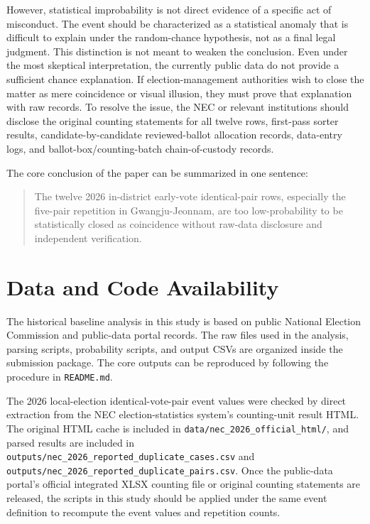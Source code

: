 \documentclass[preprint]{../ieie/IEIE}
\begin{document}
However, statistical improbability is not direct evidence of a specific act of misconduct. The event should be characterized as a statistical anomaly that is difficult to explain under the random-chance hypothesis, not as a final legal judgment. This distinction is not meant to weaken the conclusion. Even under the most skeptical interpretation, the currently public data do not provide a sufficient chance explanation. If election-management authorities wish to close the matter as mere coincidence or visual illusion, they must prove that explanation with raw records. To resolve the issue, the NEC or relevant institutions should disclose the original counting statements for all twelve rows, first-pass sorter results, candidate-by-candidate reviewed-ballot allocation records, data-entry logs, and ballot-box/counting-batch chain-of-custody records.

The core conclusion of the paper can be summarized in one sentence:

\begin{quote}
The twelve 2026 in-district early-vote identical-pair rows, especially the five-pair repetition in Gwangju-Jeonnam, are too low-probability to be statistically closed as coincidence without raw-data disclosure and independent verification.
\end{quote}

\section{Data and Code Availability}

The historical baseline analysis in this study is based on public National Election Commission and public-data portal records. The raw files used in the analysis, parsing scripts, probability scripts, and output CSVs are organized inside the submission package. The core outputs can be reproduced by following the procedure in \texttt{README.md}.

The 2026 local-election identical-vote-pair event values were checked by direct extraction from the NEC election-statistics system's counting-unit result HTML. The original HTML cache is included in \texttt{data/nec\_2026\_official\_html/}, and parsed results are included in \texttt{outputs/nec\_2026\_reported\_duplicate\_cases.csv} and \texttt{outputs/nec\_2026\_reported\_duplicate\_pairs.csv}. Once the public-data portal's official integrated XLSX counting file or original counting statements are released, the scripts in this study should be applied under the same event definition to recompute the event values and repetition counts.
\end{document}
